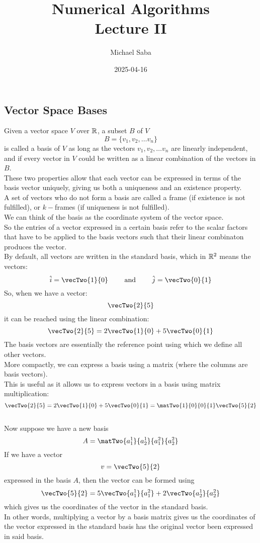 \documentclass[12pt]{article}
\title{
    \Huge Numerical Algorithms \\
    \Large Lecture II
}
\date{2025-04-16}
\author{Michael Saba}
\begin{document}
\maketitle
\newpage
\setlength{\parindent}{0pt}

\subsection*{Vector Space Bases}

Given a vector space $V$ over $\mathbb{R}$,
a subset $B$ of $V$
\[ B = \{v_1, v_2, \dots v_n \} \]
is called a basis of $V$ as long as the
vectors $v_1, v_2, \dots v_n$
are linearly independent,
and if every vector in $V$ could be written
as a linear combination of the vectors in $B$. \\
These two properties allow that each vector
can be expressed
in terms of the basis vector uniquely,
giving us both a uniqueness
and an existence property. \\

A set of vectors who do not form a basis are
called a frame (if existence is not fulfilled),
or $k-$frames (if uniqueness is not fulfilled). \\

We can think of the basis as the coordinate
system of the vector space. \\
So the entries of a vector expressed in a
certain basis refer to the scalar factors
that have to be applied to the basis vectors
such that their linear combinaton produces
the vector. \\
By default, all vectors are written in the standard
basis, which in $\mathbb{R}^2$ means the vectors:
\[ \hat{i} = \vecTwo{1}{0} \qquad \text{ and }
\qquad \hat{j} = \vecTwo{0}{1} \]
So, when we have a vector:
\[ \vecTwo{2}{5} \]
it can be reached using the linear combination:
\[ \vecTwo{2}{5} = 2 \vecTwo{1}{0} + 5 \vecTwo{0}{1} \]
The basis vectors are essentially the reference
point using which we define all other vectors. \\

More compactly, we can express a basis using
a matrix (where the columns are basis vectors). \\
This is useful as it allows us to express
vectors in a basis using matrix multiplication:
\[ \vecTwo{2}{5} = 2 \vecTwo{1}{0} + 5 \vecTwo{0}{1}
= \matTwo{1}{0}{0}{1}\vecTwo{5}{2} \] \\

Now suppose we have a new basis
\[ A = \matTwo{a_1^1}{a_2^1}{a_1^2}{a_2^2} \]
If we have a vector 
\[ v = \vecTwo{5}{2} \]
expressed in the basis $A$,
then the vector can be formed using
\[ \vecTwo{5}{2} = 5 \vecTwo{a_1^1}{a_1^2}
+ 2 \vecTwo{a_2^1}{a_2^2} \]
which gives us the coordinates of the 
vector in the standard basis. \\
In other words, multiplying a vector
by a basis matrix
gives us the coordinates of the vector
expressed in the standard basis
has the original vector been
expressed in said basis. \\
\end{document}
